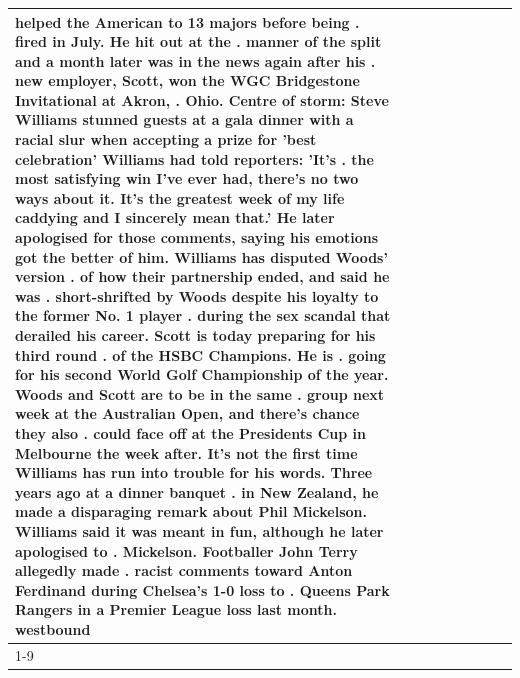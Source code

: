 \begin{table}[H]
\begin{tabular}{lllrlllll}
helped the American to 13 majors before being . fired in July. He hit out at the . manner of the split and a month later was in the news again after his . new employer, Scott, won the WGC Bridgestone Invitational at Akron, . Ohio. Centre of storm: Steve Williams stunned guests at a gala dinner with a racial slur when accepting a prize for 'best celebration' Williams had told reporters: 'It's . the most satisfying win I've ever had, there's no two ways about it. It's the greatest week of my life caddying and I sincerely mean that.' He later apologised for those comments, saying his emotions got the better of him. Williams has disputed Woods' version . of how their partnership ended, and said he was . short-shrifted by Woods despite his loyalty to the former No. 1 player . during the sex scandal that derailed his career. Scott is today preparing for his third round . of the HSBC Champions. He is . going for his second World Golf Championship of the year. Woods and Scott are to be in the same . group next week at the Australian Open, and there's chance they also . could face off at the Presidents Cup in Melbourne the week after. It's not the first time Williams has run into trouble for his words. Three years ago at a dinner banquet . in New Zealand, he made a disparaging remark about Phil Mickelson. Williams said it was meant in fun, although he later apologised to . Mickelson. Footballer John Terry allegedly made . racist comments toward Anton Ferdinand during Chelsea's 1-0 loss to . Queens Park Rangers in a Premier League loss last month. westbound \\
\cline{1-9}

\end{tabular}
\end{table}
